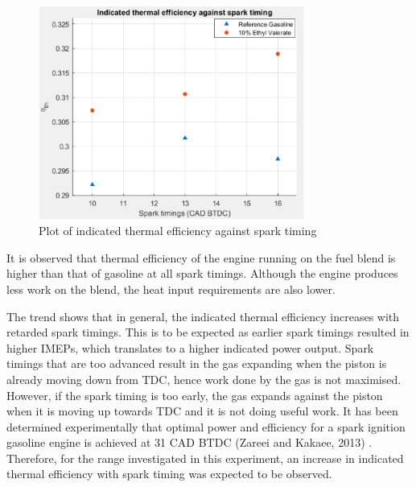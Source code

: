 \documentclass[11pt]{article}
\begin{document}
\begin{figure}[H]
    \centering
    \includegraphics[height = 7cm]{./img/diagram1.png}
    \caption{Plot of indicated thermal efficiency against spark timing}
    \label{q3-f1}
\end{figure}
It is observed that thermal efficiency of the engine running on the fuel blend is higher than that of gasoline at all spark timings. Although the engine produces less work on the blend, the heat input requirements are also lower. 

The trend shows that in general, the indicated thermal efficiency increases with retarded spark timings. This is to be expected as earlier spark timings resulted in higher IMEPs, which translates to a higher indicated power output. Spark timings that are too advanced result in the gas expanding when the piston is already moving down from TDC, hence work done by the gas is not maximised. However, if the spark timing is too early, the gas expands against the piston when it is moving up towards TDC and it is not doing useful work. It has been determined experimentally that optimal power and efficiency for a spark ignition gasoline engine is achieved at 31 CAD BTDC (Zareei and Kakaee, 2013) \cite{q1-r1}. Therefore, for the range investigated in this experiment, an increase in indicated thermal efficiency with spark timing was expected to be observed.
\end{document}
